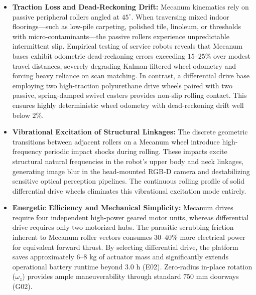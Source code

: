 \begin{itemize}[leftmargin=1.5em]
  \item \textbf{Traction Loss and Dead-Reckoning Drift:} Mecanum kinematics rely on passive peripheral rollers angled at $45^\circ$. When traversing mixed indoor floorings---such as low-pile carpeting, polished tile, linoleum, or thresholds with micro-contaminants---the passive rollers experience unpredictable intermittent slip. Empirical testing of service robots reveals that Mecanum bases exhibit odometric dead-reckoning errors exceeding $15\text{--}25\%$ over modest travel distances, severely degrading Kalman-filtered wheel odometry and forcing heavy reliance on scan matching. In contrast, a differential drive base employing two high-traction polyurethane drive wheels paired with two passive, spring-damped swivel casters provides non-slip rolling contact. This ensures highly deterministic wheel odometry with dead-reckoning drift well below $2\%$.
  \item \textbf{Vibrational Excitation of Structural Linkages:} The discrete geometric transitions between adjacent rollers on a Mecanum wheel introduce high-frequency periodic impact shocks during rolling. These impacts excite structural natural frequencies in the robot's upper body and neck linkages, generating image blur in the head-mounted RGB-D camera and destabilizing sensitive optical perception pipelines. The continuous rolling profile of solid differential drive wheels eliminates this vibrational excitation mode entirely.
  \item \textbf{Energetic Efficiency and Mechanical Simplicity:} Mecanum drives require four independent high-power geared motor units, whereas differential drive requires only two motorized hubs. The parasitic scrubbing friction inherent to Mecanum roller vectors consumes $30\text{--}40\%$ more electrical power for equivalent forward thrust. By selecting differential drive, the platform saves approximately $6\text{--}8\text{ kg}$ of actuator mass and significantly extends operational battery runtime beyond $3.0\text{ h}$ (E02). Zero-radius in-place rotation ($\omega_z$) provides ample maneuverability through standard $750\text{ mm}$ doorways (G02).
\end{itemize}

